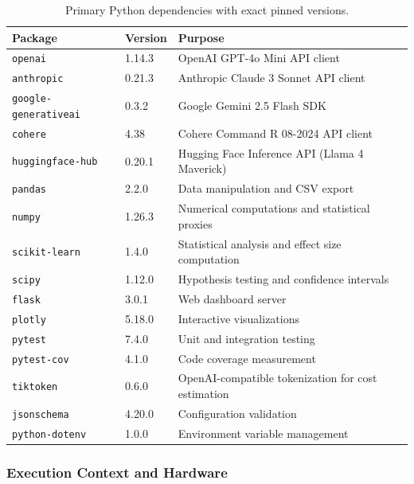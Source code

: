 \begin{table}[h!]
\centering
\caption{Primary Python dependencies with exact pinned versions.\label{tab:python_dependencies}}
\begin{tabularx}{\textwidth}{@{}l l X@{}}
\toprule
\textbf{Package} & \textbf{Version} & \textbf{Purpose} \\
\midrule
\texttt{openai} & 1.14.3 & OpenAI GPT-4o Mini API client \\
\texttt{anthropic} & 0.21.3 & Anthropic Claude 3 Sonnet API client \\
\texttt{google-generativeai} & 0.3.2 & Google Gemini 2.5 Flash SDK \\
\texttt{cohere} & 4.38 & Cohere Command R 08-2024 API client \\
\texttt{huggingface-hub} & 0.20.1 & Hugging Face Inference API (Llama 4 Maverick) \\
\texttt{pandas} & 2.2.0 & Data manipulation and CSV export \\
\texttt{numpy} & 1.26.3 & Numerical computations and statistical proxies \\
\texttt{scikit-learn} & 1.4.0 & Statistical analysis and effect size computation \\
\texttt{scipy} & 1.12.0 & Hypothesis testing and confidence intervals \\
\texttt{flask} & 3.0.1 & Web dashboard server \\
\texttt{plotly} & 5.18.0 & Interactive visualizations \\
\texttt{pytest} & 7.4.0 & Unit and integration testing \\
\texttt{pytest-cov} & 4.1.0 & Code coverage measurement \\
\texttt{tiktoken} & 0.6.0 & OpenAI-compatible tokenization for cost estimation \\
\texttt{jsonschema} & 4.20.0 & Configuration validation \\
\texttt{python-dotenv} & 1.0.0 & Environment variable management \\
\bottomrule
\end{tabularx}
\end{table}

\subsubsection{Execution Context and Hardware}

